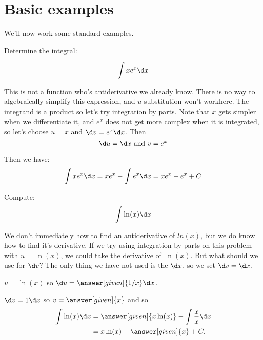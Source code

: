 \documentclass{ximera}
\begin{document}
\section{Basic examples}


We'll now work some standard examples.


\begin{example}
Determine the integral:

\[
\int xe^{x} \d x
\]

\begin{explanation}
This is not a function who's antiderivative we already know.  There is no way to algebraically simplify this expression, and $u$-substitution won't workhere.  The integrand is a product so let's try integration by parts.  Note that $x$ gets simpler when we differentiate it, and $e^{x}$ does not get more complex when it is integrated, so let's choose $u=x$ and $\d v=e^{x} \d x$.
Then 
\[
\d u= \d x \text{ and }  v=e^{x}
\]

Then we have:
\[
\int xe^{x} \d x= xe^{x}-\int e^{x} \d x=xe^{x}-e^{x} + C
\]

\end{explanation}
\end{example}

\begin{example}
Compute:
\[
\int \ln(x)\d x
\]
\begin{explanation}
We don't immediately how to find an antiderivative of $ln(x)$, but we do know how to find it's derivative.  If we try using integration by parts on this problem with $u=\ln(x)$, we could take the derivative of $\ln(x)$.  But what should we use for $\d v$?  The only thing we have not used is the $\d x$, so we set $\d v = \d x$.  

$u=\ln(x)$ so $\d u=\answer[given]{1/x}\d x$. 

$\d v=1\d x$ so $v=\answer[given]{x}$
and so 
\begin{align*}
 \int \ln(x)\d x&=\answer[given]{x \ln(x)}-\int \frac{x}{x}\d x\\
&= x\ln (x)- \answer[given]{x}+C.\\
\end{align*}
\end{explanation}
\end{example}
\end{document}
